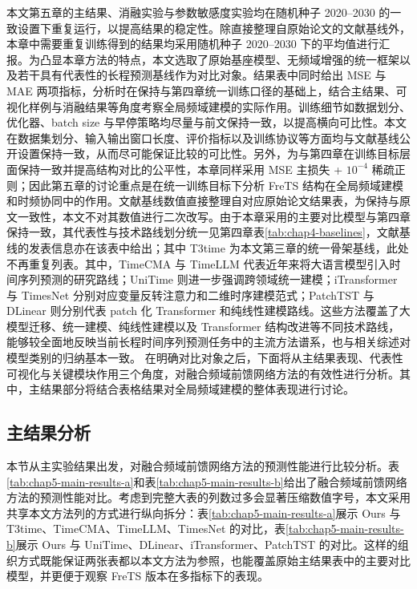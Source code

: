 \begin{table}[!htb]
\end{table} 本文第五章的主结果、消融实验与参数敏感度实验均在随机种子 2020--2030 的一致设置下重复运行，以提高结果的稳定性。除直接整理自原始论文的文献基线外，本章中需要重复训练得到的结果均采用随机种子 2020--2030 下的平均值进行汇报。为凸显本章方法的特点，本文选取了原始基座模型、无频域增强的统一框架以及若干具有代表性的长程预测基线作为对比对象。结果表中同时给出 MSE 与 MAE 两项指标，分析时在保持与第四章统一训练口径的基础上，结合主结果、可视化样例与消融结果等角度考察全局频域建模的实际作用。训练细节如数据划分、优化器、batch size 与早停策略均尽量与前文保持一致，以提高横向可比性。本文在数据集划分、输入输出窗口长度、评价指标以及训练协议等方面均与文献基线公开设置保持一致，从而尽可能保证比较的可比性。另外，为与第四章在训练目标层面保持一致并提高结构对比的公平性，本章同样采用 MSE 主损失 + $10^{-4}$ 稀疏正则；因此第五章的讨论重点是在统一训练目标下分析 FreTS 结构在全局频域建模和时频协同中的作用。文献基线数值直接整理自对应原始论文结果表，为保持与原文一致性，本文不对其数值进行二次改写。由于本章采用的主要对比模型与第四章保持一致，其代表性与技术路线划分统一见第四章表\ref{tab:chap4-baselines}，文献基线的发表信息亦在该表中给出；其中 T3time 为本文第三章的统一骨架基线，此处不再重复列表。其中，TimeCMA 与 TimeLLM 代表近年来将大语言模型引入时间序列预测的研究路线；UniTime 则进一步强调跨领域统一建模；iTransformer 与 TimesNet 分别对应变量反转注意力和二维时序建模范式；PatchTST 与 DLinear 则分别代表 patch 化 Transformer 和纯线性建模路线。这些方法覆盖了大模型迁移、统一建模、纯线性建模以及 Transformer 结构改进等不同技术路线，能够较全面地反映当前长程时间序列预测任务中的主流方法谱系，也与相关综述对模型类别的归纳基本一致。 在明确对比对象之后，下面将从主结果表现、代表性可视化与关键模块作用三个角度，对融合频域前馈网络方法的有效性进行分析。其中，主结果部分将结合表格结果对全局频域建模的整体表现进行讨论。 \subsection{主结果分析} 本节从主实验结果出发，对融合频域前馈网络方法的预测性能进行比较分析。表\ref{tab:chap5-main-results-a}和表\ref{tab:chap5-main-results-b}给出了融合频域前馈网络方法的预测性能对比。考虑到完整大表的列数过多会显著压缩数值字号，本文采用共享本文方法列的方式进行纵向拆分：表\ref{tab:chap5-main-results-a}展示 Ours 与 T3time、TimeCMA、TimeLLM、TimesNet 的对比，表\ref{tab:chap5-main-results-b}展示 Ours 与 UniTime、DLinear、iTransformer、PatchTST 的对比。这样的组织方式既能保证两张表都以本文方法为参照，也能覆盖原始主结果表中的主要对比模型，并更便于观察 FreTS 版本在多指标下的表现。 \begin{table}[!htbp]

\end{table}
